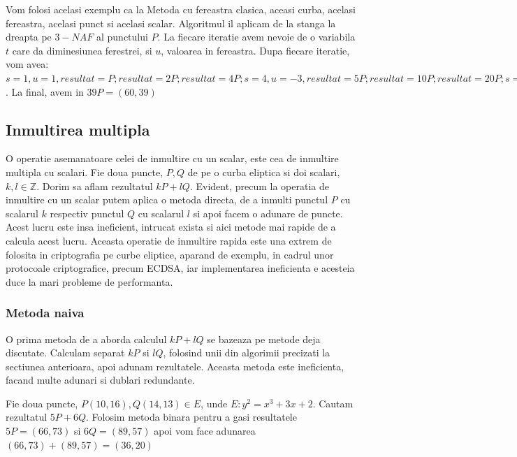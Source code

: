 \begin{ex}
Vom folosi acelasi exemplu ca la Metoda cu fereastra clasica, aceasi curba, acelasi fereastra, acelasi punct si acelasi scalar. Algoritmul il aplicam de la stanga la dreapta pe $3-NAF$ al punctului $P$. La fiecare iteratie avem nevoie de o variabila $t$ care da diminesiunea ferestrei, si $u$, valoarea in fereastra. Dupa fiecare iteratie, vom avea: $s=1, u=1, resultat=P; resultat = 2P; resultat = 4P; s=4, u=-3, resultat = 5P; resultat = 10P; resultat = 20P; s=6, u=-1, resultat=39P$. La final, avem in $39P = (60, 39)$
\end{ex}

\subsection{Inmultirea multipla}

\begin{dfn}
O operatie asemanatoare celei de inmultire cu un scalar, este cea de inmultire multipla cu scalari. Fie doua puncte, $P, Q$ de pe o curba eliptica si doi scalari, $k, l\in \mathbb{Z}$. Dorim sa aflam rezultatul $kP + lQ$. Evident, precum la operatia de inmultire cu un scalar putem aplica o metoda directa, de a inmulti punctul $P$ cu scalarul $k$ respectiv punctul $Q$ cu scalarul $l$ si apoi facem o adunare de puncte. Acest lucru este insa ineficient, intrucat exista si aici metode mai rapide de a calcula acest lucru. Aceasta operatie de inmultire rapida este una extrem de folosita in criptografia pe curbe eliptice, aparand de exemplu, in cadrul unor protocoale criptografice, precum ECDSA, iar implementarea ineficienta e acesteia duce la mari probleme de performanta. 
\end{dfn}

\subsubsection{Metoda naiva}
O prima metoda de a aborda calculul $kP + lQ$ se bazeaza pe metode deja discutate. Calculam separat $kP$ si $lQ$, folosind unii din algorimii precizati la sectiunea anterioara, apoi adunam rezultatele. Aceasta metoda este ineficienta, facand multe adunari si dublari redundante.

\begin{ex}
Fie doua puncte, $P(10, 16), Q(14, 13)\in E$, unde $E: y^2 = x^3 + 3x + 2$. Cautam rezultatul $5P + 6Q$. Folosim metoda binara pentru a gasi resultatele $5P = (66, 73)$ si
$6Q = (89, 57)$ apoi vom face adunarea $(66, 73) + (89, 57) = (36, 20)$
\end{ex}

